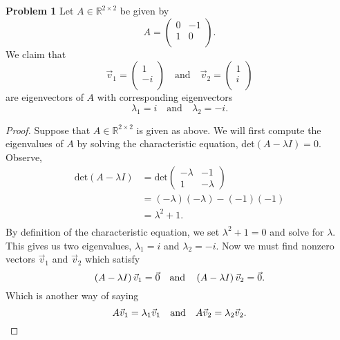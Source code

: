 \documentclass{article}
\begin{document}
\textbf{Problem 1}
Let $A \in \mathbb{R}^{2 \times 2}$ be given by $$A = \begin{pmatrix} 
0 & -1\\
1 & 0\\
\end{pmatrix}.$$ We claim that 
$$\vec{v}_1 = \begin{pmatrix} 
1\\
-i\\
\end{pmatrix} \quad \text{and} \quad \vec{v}_2 = \begin{pmatrix} 
1\\
i\\
\end{pmatrix}$$ are eigenvectors of $A$ with corresponding eigenvectors $$\lambda_1 = i \quad \text{and} \quad \lambda_2 = -i.$$
\begin{proof}
Suppose that $A \in \mathbb{R}^{2\times2}$ is given as above. We will first compute the eigenvalues of $A$ by solving the characteristic equation, det$\left( A - \lambda I \right) = 0.$ Observe,
\begin{align*}
\text{det}\left( A - \lambda I \right) &= \text{det}\begin{pmatrix}-\lambda&-1\\1&-\lambda\end{pmatrix}\\
&= \left(-\lambda\right)\left(-\lambda\right) - \left(-1\right)\left(-1\right)\\
&= \lambda^2 +1.\\
\end{align*}
By definition of the characteristic equation, we set $\lambda^2 + 1 = 0$ and solve for $\lambda$. This gives us two eigenvalues, $\lambda_1 = i$ and $\lambda_2 = -i$. Now we must find nonzero vectors $\vec{v}_1$ and $\vec{v}_2$ which satisfy
\begin{equation*}
\left( A - \lambda I \right)\vec{v}_1 = \vec{0} \quad \text{and} \quad \left( A - \lambda I \right)\vec{v}_2 = \vec{0}.\\
\end{equation*}
Which is another way of saying
\begin{equation*}
A\vec{v}_1 = \lambda_1 \vec{v}_1 \quad \text{and} \quad A\vec{v}_2 = \lambda_2 \vec{v}_2.\\
\end{equation*}


\end{proof}
\end{document}
